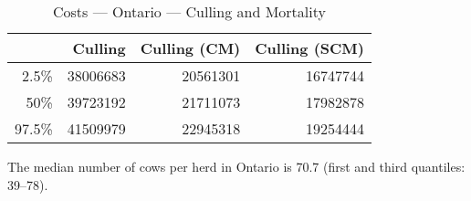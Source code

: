 \documentclass{article}\usepackage[]{graphicx}\usepackage[]{color}
\begin{document}
\begin{table}[ht]
\centering
\begin{tabular}{rrrr}
  \hline
 & Culling & Culling (CM) & Culling (SCM) \\ 
  \hline
2.5\% & 38006683 & 20561301 & 16747744 \\ 
  50\% & 39723192 & 21711073 & 17982878 \\ 
  97.5\% & 41509979 & 22945318 & 19254444 \\ 
   \hline
\end{tabular}
\caption{Costs --- Ontario --- Culling and Mortality} 
\label{tab:ontario:c}
\end{table}


The median number of cows per herd in Ontario is 70.7 (first and third quantiles: 39--78).
\clearpage
\end{document}
